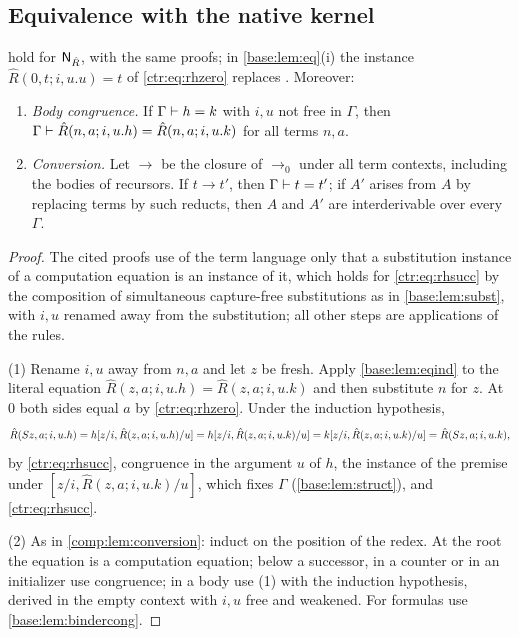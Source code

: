\subsection{Equivalence with the native kernel}

\begin{lemma}\label{ctr:lem:rhnative}
hold for $\mathsf{N}_{\hat R}$, with the same proofs; in \cref{base:lem:eq}(i) the instance
$\hat R(0,t;i,u.u)=t$ of \eqref{ctr:eq:rhzero} replaces . Moreover:
\begin{enumerate}
\item \emph{Body congruence.} If $\Gamma\vdash h=k$ with $i,u$ not free in $\Gamma$, then
$\Gamma\vdash\hat R(n,a;i,u.h)=\hat R(n,a;i,u.k)$ for all terms $n,a$.
\item \emph{Conversion.} Let $\to$ be the closure of $\to_0$ under all term contexts,
including the bodies of recursors. If $t\to t'$, then $\Gamma\vdash t=t'$; if $A'$ arises from
$A$ by replacing terms by such reducts, then $A$ and $A'$ are interderivable over every
$\Gamma$.
\end{enumerate}
\end{lemma}
\begin{proof}
The cited proofs use of the term language only that a substitution instance of a
computation equation is an instance of it, which holds for \eqref{ctr:eq:rhsucc} by the
composition of simultaneous capture-free substitutions as in \cref{base:lem:subst}, with $i,u$
renamed away from the substitution; all other steps are applications of the rules.

(1) Rename $i,u$ away from $n,a$ and let $z$ be fresh. Apply \cref{base:lem:eqind} to the
literal equation $\hat R(z,a;i,u.h)=\hat R(z,a;i,u.k)$ and then substitute $n$ for $z$. At $0$
both sides equal $a$ by \eqref{ctr:eq:rhzero}. Under the induction hypothesis,
\[
 \hat R(S z,a;i,u.h)=h[z/i,\hat R(z,a;i,u.h)/u]=h[z/i,\hat R(z,a;i,u.k)/u]
 =k[z/i,\hat R(z,a;i,u.k)/u]=\hat R(S z,a;i,u.k),
\]
by \eqref{ctr:eq:rhsucc}, congruence in the argument $u$ of $h$, the instance of the premise
under $[z/i,\hat R(z,a;i,u.k)/u]$, which fixes $\Gamma$ (\cref{base:lem:struct}), and
\eqref{ctr:eq:rhsucc}.

(2) As in \cref{comp:lem:conversion}: induct on the position of the redex. At the root the
equation is a computation equation; below a successor, in a counter or in an initializer use
congruence; in a body use (1) with the induction hypothesis, derived in the empty context with
$i,u$ free and weakened. For formulas use \cref{base:lem:bindercong}.
\end{proof}

